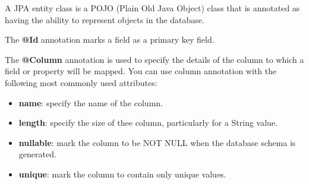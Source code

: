 A JPA entity class is a POJO (Plain Old Java Object) class  that is annotated as having the ability to represent objects in the database.

The \textbf{@Id} annotation marks a field as a primary key field.

The \textbf{@Column} annotation is used to specify the details of the column to which a field or property will be mapped. You can use column annotation with the following most commonly used attributes:
\begin{itemize}
\item \textbf{name}: specify the name of the column.
\item \textbf{length}: specify the size of thee column, particularly for a String value.
\item \textbf{nullable}: mark the column to be NOT NULL when the database schema is generated.
\item \textbf{unique}: mark the column to contain only unique values.
\end{itemize}

